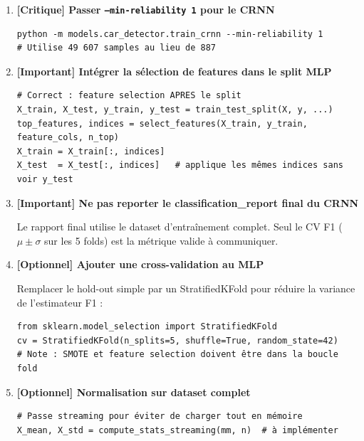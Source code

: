 \documentclass[11pt,a4paper]{article}
\newcommand{\param}[1]{\texttt{#1}}
\begin{document}
\begin{enumerate}[leftmargin=*, label=\textbf{R\arabic{*}.}]

\item \textbf{[Critique] Passer \param{--min-reliability 1} pour le CRNN}

\begin{lstlisting}
python -m models.car_detector.train_crnn --min-reliability 1
# Utilise 49 607 samples au lieu de 887
\end{lstlisting}

\item \textbf{[Important] Intégrer la sélection de features dans le split MLP}

\begin{lstlisting}
# Correct : feature selection APRES le split
X_train, X_test, y_train, y_test = train_test_split(X, y, ...)
top_features, indices = select_features(X_train, y_train, feature_cols, n_top)
X_train = X_train[:, indices]
X_test  = X_test[:, indices]   # applique les mêmes indices sans voir y_test
\end{lstlisting}

\item \textbf{[Important] Ne pas reporter le classification\_report final du CRNN}

Le rapport final utilise le dataset d'entraînement complet. Seul le CV F1
($\mu \pm \sigma$ sur les 5 folds) est la métrique valide à communiquer.

\item \textbf{[Optionnel] Ajouter une cross-validation au MLP}

Remplacer le hold-out simple par un StratifiedKFold pour réduire
la variance de l'estimateur F1 :

\begin{lstlisting}
from sklearn.model_selection import StratifiedKFold
cv = StratifiedKFold(n_splits=5, shuffle=True, random_state=42)
# Note : SMOTE et feature selection doivent être dans la boucle fold
\end{lstlisting}

\item \textbf{[Optionnel] Normalisation sur dataset complet}

\begin{lstlisting}
# Passe streaming pour éviter de charger tout en mémoire
X_mean, X_std = compute_stats_streaming(mm, n)  # à implémenter
\end{lstlisting}

\end{enumerate}
\end{document}
